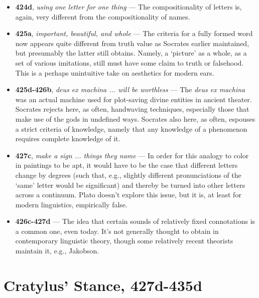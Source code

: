 \documentclass[12pt]{article}
\begin{document}
\begin{itemize}
\item \textbf{424d}, \textit{using one letter for one thing} --- The compositionality of letters is, again, very different from the compositionality of names.

\item \textbf{425a}, \textit{important, beautiful, and whole} --- The criteria for a fully formed word now appears quite different from truth value as Socrates earlier maintained, but presumably the latter still obtains. Namely, a `picture' as a whole, as a set of various imitations, still must have some claim to truth or falsehood. This is a perhaps unintuitive take on aesthetics for modern ears.

\item \textbf{425d-426b}, \textit{deus ex machina ... will be worthless} --- The \textit{deus ex machina} was an actual machine used for plot-saving divine entities in ancient theater. Socrates rejects here, as often, handwaving techniques, especially those that make use of the gods in undefined ways. Socrates also here, as often, espouses a strict criteria of knowledge, namely that any knowledge of a phenomenon requires complete knowledge of it.

\item \textbf{427c}, \textit{make a sign ... things they name} --- In order for this analogy to color in paintings to be apt, it would have to be the case that different letters change by degrees (such that, e.g., slightly different pronunciations of the `same' letter would be significant) and thereby be turned into other letters across a continuum. Plato doesn't explore this issue, but it is, at least for modern linguistics, empirically false.

\item \textbf{426c-427d} --- The idea that certain sounds of relatively fixed connotations is a common one, even today. It's not generally thought to obtain in contemporary linguistic theory, though some relatively recent theorists maintain it, e.g., Jakobson.

\end{itemize}


\section{Cratylus' Stance, 427d-435d}
\end{document}
